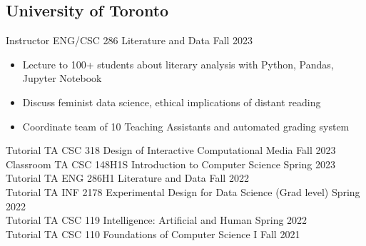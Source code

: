 \subsection{University of Toronto}

Instructor ENG/CSC 286 Literature and Data \hfill Fall 2023\\
\begin{itemize} 
\item Lecture to 100+ students about literary analysis with Python, Pandas, Jupyter Notebook
\item Discuss feminist data science, ethical implications of distant reading
\item Coordinate team of 10 Teaching Assistants and automated grading system
\end{itemize} 

Tutorial TA CSC 318 Design of Interactive Computational Media \hfill Fall 2023\\

Classroom TA CSC 148H1S Introduction to Computer Science \hfill Spring 2023\\

Tutorial TA ENG 286H1 Literature and Data \hfill Fall 2022\\

Tutorial TA INF 2178 Experimental Design for Data Science (Grad level) \hfill Spring 2022\\

Tutorial TA CSC 119 Intelligence: Artificial and Human  \hfill Spring 2022\\
 
Tutorial TA CSC 110 Foundations of Computer Science I \hfill Fall 2021\\
